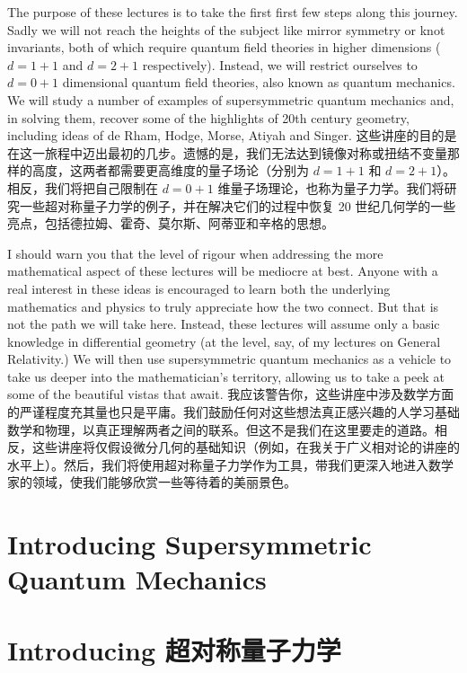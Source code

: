 \documentclass{ctexart}
\begin{document}
\begin{paracol}{2}
The purpose of these lectures is to take the first first few steps along this journey. Sadly we will not reach the heights of the subject like mirror symmetry or knot invariants, both of which require quantum field theories in higher dimensions ($d = 1 + 1$ and $d = 2 + 1$ respectively). Instead, we will restrict ourselves to $d = 0 + 1$ dimensional quantum field theories, also known as quantum mechanics. We will study a number of examples of supersymmetric quantum mechanics and, in solving them, recover some of the highlights of 20th century geometry, including ideas of de Rham, Hodge, Morse, Atiyah and Singer.
\switchcolumn
这些讲座的目的是在这一旅程中迈出最初的几步。遗憾的是，我们无法达到镜像对称或扭结不变量那样的高度，这两者都需要更高维度的量子场论（分别为 $d = 1 + 1$ 和 $d = 2 + 1$）。相反，我们将把自己限制在 $d = 0 + 1$ 维量子场理论，也称为量子力学。我们将研究一些超对称量子力学的例子，并在解决它们的过程中恢复 20 世纪几何学的一些亮点，包括德拉姆、霍奇、莫尔斯、阿蒂亚和辛格的思想。
\switchcolumn*

I should warn you that the level of rigour when addressing the more mathematical aspect of these lectures will be mediocre at best. Anyone with a real interest in these ideas is encouraged to learn both the underlying mathematics and physics to truly appreciate how the two connect. But that is not the path we will take here. Instead, these lectures will assume only a basic knowledge in differential geometry (at the level, say, of my lectures on General Relativity.) We will then use supersymmetric quantum mechanics as a vehicle to take us deeper into the mathematician's territory, allowing us to take a peek at some of the beautiful vistas that await.
\switchcolumn
我应该警告你，这些讲座中涉及数学方面的严谨程度充其量也只是平庸。我们鼓励任何对这些想法真正感兴趣的人学习基础数学和物理，以真正理解两者之间的联系。但这不是我们在这里要走的道路。相反，这些讲座将仅假设微分几何的基础知识（例如，在我关于广义相对论的讲座的水平上）。然后，我们将使用超对称量子力学作为工具，带我们更深入地进入数学家的领域，使我们能够欣赏一些等待着的美丽景色。
\switchcolumn*

\section{Introducing Supersymmetric Quantum Mechanics}
\switchcolumn
\section*{Introducing 超对称量子力学}
\switchcolumn*


\end{paracol}
\end{document}
